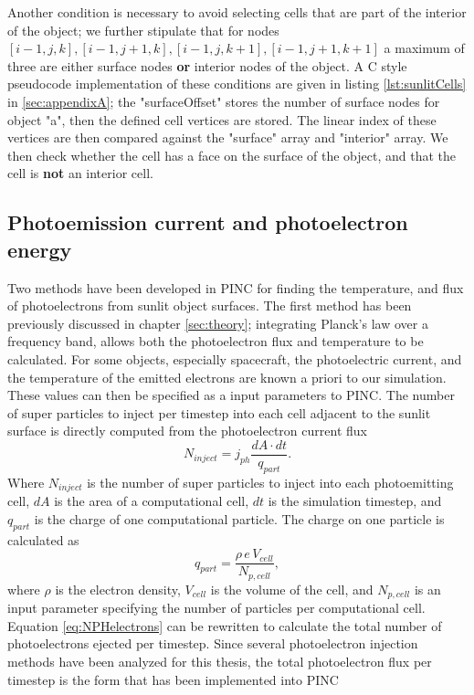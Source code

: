 Another condition is necessary to avoid selecting cells that are part of the interior of the object; we further stipulate that for nodes $[i-1,j,k], [i-1,j+1,k], [i-1,j,k+1], [i-1,j+1,k+1]$ a maximum of three are either surface nodes \textbf{or} interior nodes of the object. A C style pseudocode implementation of these conditions are given in listing \ref{lst:sunlitCells} in \cref{sec:appendixA}; the "surfaceOffset" stores the number of surface nodes for object "a", then the defined cell vertices are stored. The linear index of these vertices are then compared against the "surface" array and "interior" array. We then check whether the cell has a face on the surface of the object, and that the cell is \textbf{not} an interior cell.


\subsection{Photoemission current and photoelectron energy}\label{subsection:CurrentDensity}
Two methods have been developed in PINC for finding the temperature, and flux of photoelectrons from sunlit object surfaces. The first method has been previously discussed in chapter \cref{sec:theory}; integrating Planck's law over a frequency band, allows both the photoelectron flux and temperature to be calculated. For some objects, especially spacecraft, the photoelectric current, and the temperature of the emitted electrons are known a priori to our simulation. These values can then be specified as a input parameters to PINC. The number of super particles to inject per timestep into each cell adjacent to the sunlit surface is directly computed from the photoelectron current flux \parencite{Deca2013}
\begin{equation}\label{eq:NPHelectrons}
    N_{inject} = j_{ph} \frac{dA \cdot dt}{q_{part}}.
\end{equation}
Where $N_{inject}$ is the number of super particles to inject into each photoemitting cell, $dA$ is the area of a computational cell, $dt$ is the simulation timestep, and $q_{part}$ is the charge of one computational particle. The charge on one particle is calculated as
\begin{equation}
    q_{part} = \frac{\rho \, e \, V_{cell}}{N_{p,cell}},
\end{equation}
where $\rho$ is the electron density, $V_{cell}$ is the volume of the cell, and $N_{p,cell}$ is an input parameter specifying the number of particles per computational cell. Equation \eqref{eq:NPHelectrons} can be rewritten to calculate the total number of photoelectrons ejected per timestep. Since several photoelectron injection methods have been analyzed for this thesis, the total photoelectron flux per timestep is the form that has been implemented into PINC
